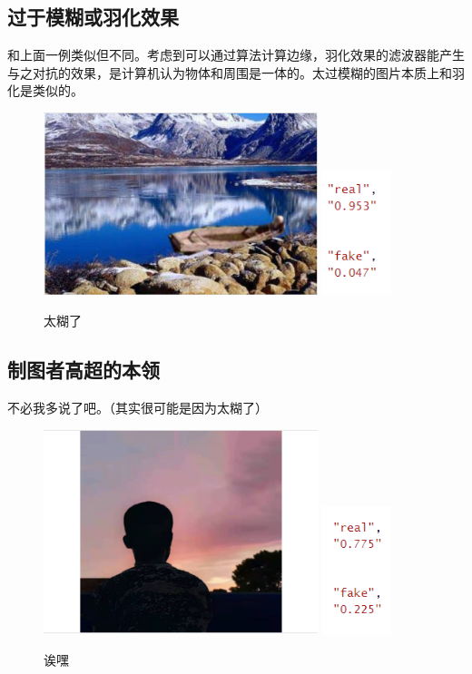 \documentclass[boldfont,linespread=1.35]{ctexart}
\begin{document}
\subsection{过于模糊或羽化效果}
和上面一例类似但不同。考虑到可以通过算法计算边缘，羽化效果的滤波器能产生与之对抗的效果，是计算机认为物体和周围是一体的。太过模糊的图片本质上和羽化是类似的。
\begin{figure}[h]
	\centering
	{\includegraphics[width=8cm]{5}}
	{\includegraphics[width=2cm]{6}}
	\color{gray}\caption{太糊了}
\end{figure}
\subsection{制图者高超的本领}
不必我多说了吧。（其实很可能是因为太糊了）
\begin{figure}[h]
	\centering
	{\includegraphics[width=8cm]{7}}
	{\includegraphics[width=2cm]{8}}
	\color{gray}\caption{诶嘿}
\end{figure}
\end{document}

